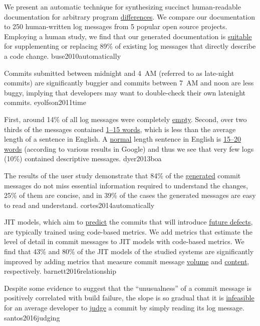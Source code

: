 \documentclass{article}
\begin{document}
  {We present an automatic technique for synthesizing succinct human-readable documentation for arbitrary program \ul{differences}. We compare our documentation to 250 human-written log messages from 5 popular open source projects. Employing a human study, we find that our generated documentation is \ul{suitable} for supplementing or replacing 89\% of existing log messages that directly describe a code change.}
  {buse2010automatically}

  {Commits submitted between midnight and 4~AM (referred to as late-night commits) are significantly buggier and commits between 7~AM and noon are less buggy, implying that developers may want to double-check their own latenight commits.}
  {eyolfson2011time}

  {First, around 14\% of all log messages were completely \ul{empty}. Second, over two thirds of the messages contained \ul{1–15 words}, which is less than the average length of a sentence in English. A \ul{normal} length sentence in English is \ul{15–20 words} (according to various results in Google) and thus we see that very few logs (10\%) contained descriptive messages.}
  {dyer2013boa}

  {The results of the user study demonstrate that 84\% of the \ul{generated} commit messages do not miss essential information required to understand the changes, 25\% of them are concise, and in 39\% of the cases the generated messages are easy to read and understand.}
  {cortes2014automatically}

  {JIT models, which aim to \ul{predict} the commits that will introduce \ul{future defects}, are typically trained using code-based metrics. We add metrics that estimate the level of detail in commit messages to JIT models with code-based metrics. We find that 43\% and 80\% of the JIT models of the studied systems are significantly improved by adding metrics that measure commit message \ul{volume} and \ul{content}, respectively.}
  {barnett2016relationship}

  {Despite some evidence to suggest that the ``unusualness'' of a commit message is positively correlated with build failure, the slope is so gradual that it is \ul{infeasible} for an average developer to \ul{judge} a commit by simply reading its log message.}
  {santos2016judging}
\end{document}
